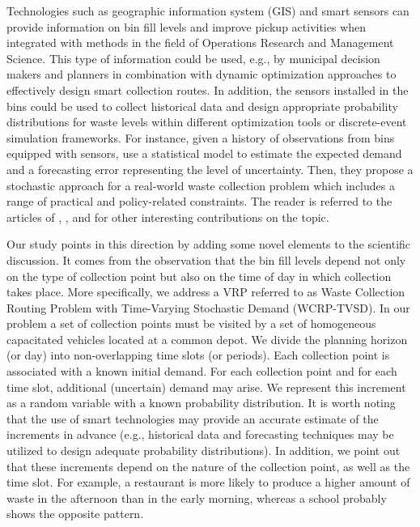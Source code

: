 \documentclass[authoryear,preprint,12pt]{elsarticle}
\begin{document}
Technologies such as geographic information system (GIS) and smart sensors can provide information on bin fill levels and improve pickup activities when integrated with methods in the field of Operations Research and Management Science. This type of information could be used, e.g., by municipal decision makers and planners in combination with dynamic optimization approaches to effectively design smart collection routes. In addition, the sensors installed in the bins could be used to collect historical data and design appropriate probability distributions for waste levels within different optimization tools or discrete-event simulation frameworks. For instance, given a history of observations from bins equipped with sensors, \cite{Markov2020} use a statistical model to estimate the expected demand and a forecasting error representing the level of uncertainty. Then, they propose a stochastic approach for a real-world waste collection problem which includes a range of practical and policy-related constraints. The reader is referred to the articles of \cite{Johansson2006}, \cite{Rovetta2009}, and \cite{Morais2024} for other interesting contributions on the topic. 

Our study points in this direction by adding some novel elements to the scientific discussion. It comes from the observation that the bin fill levels depend not only on the type of collection point but also on the time of day in which collection takes place.        
More specifically, we address a VRP referred to as Waste Collection Routing Problem with Time-Varying Stochastic Demand (WCRP-TVSD). In our problem a set of collection points must be visited by a set of homogeneous capacitated vehicles located at a common depot. We divide the planning horizon (or day) into non-overlapping time slots (or periods). 
Each collection point is associated with a known initial demand. For each collection point and for each time slot, additional (uncertain) demand may
arise. We represent this increment as a random variable with a known probability distribution.
%
It is worth noting that the use of smart technologies may provide an accurate estimate of the increments in advance (e.g., historical data and forecasting techniques may be utilized to design adequate probability distributions). In addition, we point out that these increments depend on the nature of the collection point, as well as the time slot. For example, a restaurant is more likely to produce a higher amount of waste in the afternoon than in the early morning, whereas a school probably shows the opposite pattern.
\end{document}
